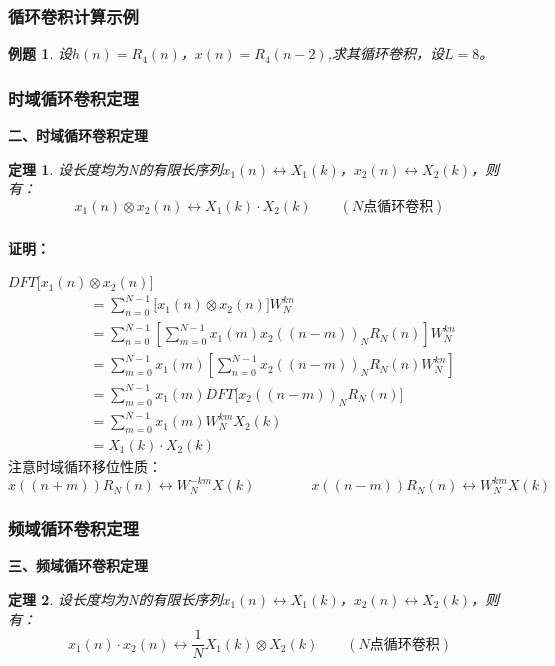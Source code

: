\documentclass[notheorems,compress,mathserif,table]{beamer}
\newtheorem{theorem}{定理}
\newtheorem{example}{例题}
\begin{document}
\begin{frame}[shrink]\frametitle{循环卷积计算示例}%
\begin{example}
设$h(n)=R_4(n)$，$x(n) = R_4(n-2)$,求其循环卷积，设$L=8$。
\end{example}
\end{frame}
%
%
%
\begin{frame}[shrink]\frametitle{时域循环卷积定理}%
\textbf{二、时域循环卷积定理}
\quad\newline\quad
\begin{theorem}
设长度均为N的有限长序列$x_1(n)\leftrightarrow X_1(k)$，$x_2(n)\leftrightarrow X_2(k)$，则有：
$$x_1(n)\otimes x_2(n) \longleftrightarrow X_1(k)\cdot X_2(k) \quad\quad (\mbox{$N$点循环卷积})$$
\end{theorem}
\end{frame}

\begin{frame}[shrink]\frametitle{}%
\textbf{证明：}

$DFT\big[ x_1(n)\otimes x_2(n)\big]$
\begin{equation*}
\begin{split}
    \quad
         &= \sum_{n=0}^{N-1}\bigg[x_1(n)\otimes x_2(n)\bigg]W_N^{kn} \\
         &= \sum_{n=0}^{N-1}\left[\sum_{m=0}^{N-1}x_1(m) x_2((n-m))_N R_N(n) \right] W_N^{kn}   \\
         &= \sum_{m=0}^{N-1}x_1(m)\left[ \sum_{n=0}^{N-1} x_2((n-m))_N R_N(n) W_N^{kn} \right]   \\
         &= \sum_{m=0}^{N-1}x_1(m) DFT\bigg[  x_2((n-m))_N R_N(n) \bigg]  \quad   \\
         &= \sum_{m=0}^{N-1}x_1(m)W_N^{km} X_2(k)  \;\qquad\qquad      \\
         &= X_1(k)\cdot X_2(k)
\end{split}
\end{equation*}
注意时域循环移位性质：
$$x((n+m))R_N(n)\leftrightarrow W_N^{-km}X(k)  \qquad\qquad   x((n-m))R_N(n)\leftrightarrow W_N^{km}X(k) $$
\end{frame}
%
%





\begin{frame}[shrink]\frametitle{频域循环卷积定理}%
\textbf{三、频域循环卷积定理}
\quad\newline\quad
\begin{theorem}
设长度均为N的有限长序列$x_1(n)\leftrightarrow X_1(k)$，$x_2(n)\leftrightarrow X_2(k)$，则有：
$$x_1(n)\cdot x_2(n)\longleftrightarrow\frac{1}{N}X_1(k)\otimes X_2(k)\quad\quad(\mbox{$N$点循环卷积})$$
\end{theorem}
\end{frame}
\end{document}

